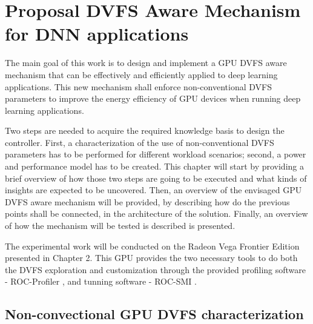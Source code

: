 
\chapter{Proposal DVFS Aware Mechanism for DNN applications}
\label{chapter:implementation}

The main goal of this work is to design and implement a GPU DVFS aware mechanism that can be effectively and efficiently applied to deep learning applications. This new mechanism shall enforce non-conventional DVFS parameters to improve the energy efficiency of GPU devices when running deep learning applications. 

Two steps are needed to acquire the required knowledge basis to design the controller. First, a characterization of the use of non-conventional DVFS parameters has to be performed for different workload scenarios; second, a power and performance model has to be created. This chapter will start by providing a brief overview of how those two steps are going to be executed and what kinds of insights are expected to be uncovered. Then, an overview of the envisaged GPU DVFS aware mechanism will be provided, by describing how do the previous points shall be connected, in the architecture of the solution. Finally, an overview of how the mechanism will be tested is described is presented.

The experimental work will be conducted on the Radeon Vega Frontier Edition presented in Chapter 2. This GPU provides the two necessary tools to do both the DVFS exploration and customization through the provided profiling software - ROC-Profiler \cite{noauthor_rocm-developer-tools/rocprofiler_2019}, and tunning software - ROC-SMI \cite{noauthor_radeonopencompute/roc-smi_2019}.

\section{Non-convectional GPU DVFS characterization}

